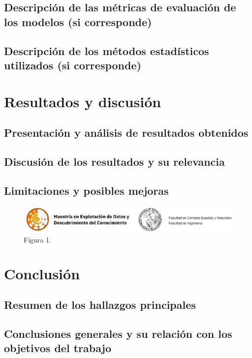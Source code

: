 \documentclass[a4paper]{report}
\begin{document}
\section{Descripción de las métricas de evaluación de los modelos (si corresponde)}

\section{Descripción de los métodos estadísticos utilizados (si corresponde)}


\chapter{Resultados y discusión}

\section{Presentación y análisis de resultados obtenidos}

\section{Discusión de los resultados y su relevancia}

\section{Limitaciones y posibles mejoras}

\begin{figure}
\centering
\includegraphics[width=\textwidth]{logos}
\caption{Figura 1.}
\label{fig:figura1}
\end{figure}



\chapter{Conclusión}

\section{Resumen de los hallazgos principales}

\section{Conclusiones generales y su relación con los objetivos del trabajo}
\end{document}
